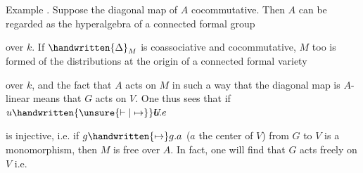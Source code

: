 Example . Suppose the diagonal map of $A$ cocommutative. Then $A$ can be regarded as the hyperalgebra of a connected formal group  over $k$. If $\handwritten{\Delta}_{M}$ is coassociative and cocommutative, $M$ too is formed of the distributions at the origin of a connected formal variety  over $k$, and the fact that $A$ acts on $M$ in such a way that the diagonal map is $A$-linear means that $G$ acts on $V$. One thus sees that if $u\handwritten{\unsure{\vdash|\mapsto}}\rlap{\(U\)}u.e$  is injective, i.e. if $g\handwritten{\mapsto}g.a$ ($a$ the center of $V$) from $G$ to $V$ is a monomorphism, then $M$ is free over $A$. In fact, one will find that $G$ acts freely on $V$ i.e.
